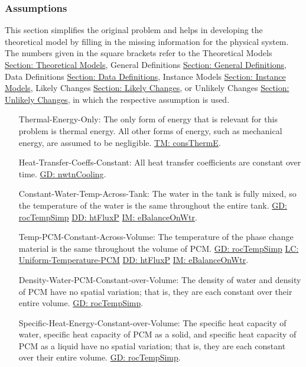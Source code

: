 \documentclass[12pt]{article}
\begin{document}
\subsubsection{Assumptions}
\label{Sec:Assumps}
This section simplifies the original problem and helps in developing the theoretical model by filling in the missing information for the physical system. The numbers given in the square brackets refer to the Theoretical Models \hyperref[Sec:TMs]{Section: Theoretical Models}, General Definitions \hyperref[Sec:GDs]{Section: General Definitions}, Data Definitions \hyperref[Sec:DDs]{Section: Data Definitions}, Instance Models \hyperref[Sec:IMs]{Section: Instance Models}, Likely Changes \hyperref[Sec:LCs]{Section: Likely Changes}, or Unlikely Changes \hyperref[Sec:UCs]{Section: Unlikely Changes}, in which the respective assumption is used.
\begin{itemize}
\item[Thermal-Energy-Only:\phantomsection\label{assumpTEO}]The only form of energy that is relevant for this problem is thermal energy. All other forms of energy, such as mechanical energy, are assumed to be negligible. \hyperref[TM:consThermE]{TM: consThermE}.
\item[Heat-Transfer-Coeffs-Constant:\phantomsection\label{assumpHTCC}]All heat transfer coefficients are constant over time. \hyperref[GD:nwtnCooling]{GD: nwtnCooling}.
\item[Constant-Water-Temp-Across-Tank:\phantomsection\label{assumpCWTAT}]The water in the tank is fully mixed, so the temperature of the water is the same throughout the entire tank. \hyperref[GD:rocTempSimp]{GD: rocTempSimp} \hyperref[DD:htFluxP]{DD: htFluxP} \hyperref[IM:eBalanceOnWtr]{IM: eBalanceOnWtr}.
\item[Temp-PCM-Constant-Across-Volume:\phantomsection\label{assumpTPCAV}]The temperature of the phase change material is the same throughout the volume of PCM. \hyperref[GD:rocTempSimp]{GD: rocTempSimp} \hyperref[likeChgUTP]{LC: Uniform-Temperature-PCM} \hyperref[DD:htFluxP]{DD: htFluxP} \hyperref[IM:eBalanceOnWtr]{IM: eBalanceOnWtr}.
\item[Density-Water-PCM-Constant-over-Volume:\phantomsection\label{assumpDWPCoV}]The density of water and density of PCM have no spatial variation; that is, they are each constant over their entire volume. \hyperref[GD:rocTempSimp]{GD: rocTempSimp}.
\item[Specific-Heat-Energy-Constant-over-Volume:\phantomsection\label{assumpSHECov}]The specific heat capacity of water, specific heat capacity of PCM as a solid, and specific heat capacity of PCM as a liquid have no spatial variation; that is, they are each constant over their entire volume. \hyperref[GD:rocTempSimp]{GD: rocTempSimp}.

\end{itemize}
\end{document}
